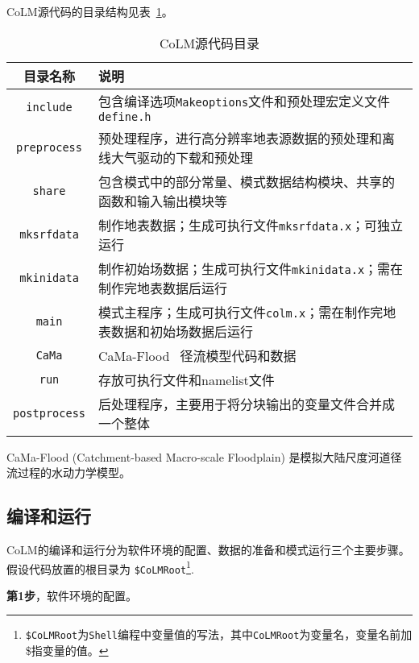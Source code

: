 CoLM源代码的目录结构见表~\ref{subdirectories}。
\begin{table}[!htbp]\small
\caption{CoLM源代码目录} \label{subdirectories}
\centering \renewcommand{\arraystretch}{1.5}
\begin{threeparttable}
\begin{tabular}{cp{}}
\toprule
\textbf{目录名称} & \textbf{说明} \\
\midrule
\texttt{include} & 包含编译选项\texttt{Makeoptions}文件和预处理宏定义文件\texttt{define.h} \\
\texttt{preprocess} & 预处理程序，进行高分辨率地表源数据的预处理和离线大气驱动的下载和预处理 \\
\texttt{share} & 包含模式中的部分常量、模式数据结构模块、共享的函数和输入输出模块等 \\
\texttt{mksrfdata} & 制作地表数据；生成可执行文件\texttt{mksrfdata.x}；可独立运行 \\
\texttt{mkinidata} & 制作初始场数据；生成可执行文件\texttt{mkinidata.x}；需在制作完地表数据后运行\\
\texttt{main} & 模式主程序；生成可执行文件\texttt{colm.x}；需在制作完地表数据和初始场数据后运行\\
\texttt{CaMa} & CaMa-Flood\tnote{1} ~径流模型代码和数据 \\
\texttt{run} & 存放可执行文件和namelist文件 \\
\texttt{postprocess} & 后处理程序，主要用于将分块输出的变量文件合并成一个整体 \\
\bottomrule
\end{tabular}
\begin{tablenotes}
\footnotesize
\item[1] CaMa-Flood (Catchment-based Macro-scale Floodplain) 是模拟大陆尺度河道径流过程的水动力学模型。
\end{tablenotes} 
\end{threeparttable}
\end{table}

\subsection{编译和运行}\label{comprun}

CoLM的编译和运行分为软件环境的配置、数据的准备和模式运行三个主要步骤。假设代码放置的根目录为 \texttt{\$CoLMRoot}\footnote{\texttt{\$CoLMRoot}为\texttt{Shell}编程中变量值的写法，其中\texttt{CoLMRoot}为变量名，变量名前加\$指变量的值。}.

\textbf{第1步}，软件环境的配置。

